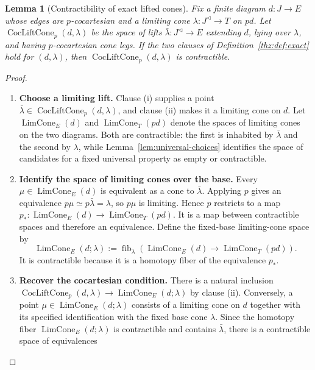\documentclass[oneside]{article}
\theoremstyle{plain}
\newtheorem{lemma}[theorem]{Lemma}
\theoremstyle{definition}
\theoremstyle{remark}
\newcommand{\fib}{\operatorname{fib}}
\begin{document}
\begin{lemma}[Contractibility of exact lifted cones]\label{thz:lem:exact-lift-cones}
Fix a finite diagram $d:J\to E$ whose edges are $p$-cocartesian and a
limiting cone $\lambda:J^{\triangleleft}\to T$ on $pd$.  Let
$\operatorname{CocLiftCone}_p(d,\lambda)$ be the space of lifts
$\bar\lambda:J^{\triangleleft}\to E$ extending $d$, lying over $\lambda$,
and having $p$-cocartesian cone legs.  If the two clauses of
Definition~\ref{thz:def:exact} hold for $(d,\lambda)$, then
$\operatorname{CocLiftCone}_p(d,\lambda)$ is contractible.
\end{lemma}
\begin{proof}
\leavevmode
\begin{enumerate}
\item \textbf{Choose a limiting lift.} Clause (i) supplies a point
$\bar\lambda\in\operatorname{CocLiftCone}_p(d,\lambda)$, and clause (ii)
makes it a limiting cone on $d$.  Let $\operatorname{LimCone}_E(d)$ and
$\operatorname{LimCone}_T(pd)$ denote the spaces of limiting cones on the two
diagrams.  Both are contractible: the first is inhabited by $\bar\lambda$ and
the second by $\lambda$, while Lemma~\ref{lem:universal-choices} identifies the
space of candidates for a fixed universal property as empty or contractible.
\item \textbf{Identify the space of limiting cones over the base.} Every $\mu\in\operatorname{LimCone}_E(d)$ is equivalent as a cone to
$\bar\lambda$.  Applying $p$ gives an equivalence
$p\mu\simeq p\bar\lambda=\lambda$, so $p\mu$ is limiting.  Hence $p$ restricts
to a map $p_*:\operatorname{LimCone}_E(d)\longrightarrow \operatorname{LimCone}_T(pd).$ It is a map between contractible spaces and therefore an equivalence.  Define
the fixed-base limiting-cone space by
\[
 \operatorname{LimCone}_E(d;\lambda):=
 \fib_\lambda\!\left(
   \operatorname{LimCone}_E(d)\longrightarrow
   \operatorname{LimCone}_T(pd)
 \right).
\]
It is contractible because it is a homotopy fiber of the equivalence $p_*$.
\item \textbf{Recover the cocartesian condition.} There is a natural inclusion $\operatorname{CocLiftCone}_p(d,\lambda) \longrightarrow \operatorname{LimCone}_E(d;\lambda)$ by clause (ii).  Conversely, a point
$\mu\in\operatorname{LimCone}_E(d;\lambda)$ consists of a limiting cone on
$d$ together with its specified identification with the fixed base cone
$\lambda$.  Since the homotopy fiber
$\operatorname{LimCone}_E(d;\lambda)$ is contractible and contains
$\bar\lambda$, there is a contractible space of equivalences

\end{enumerate}
\end{proof}
\end{document}
